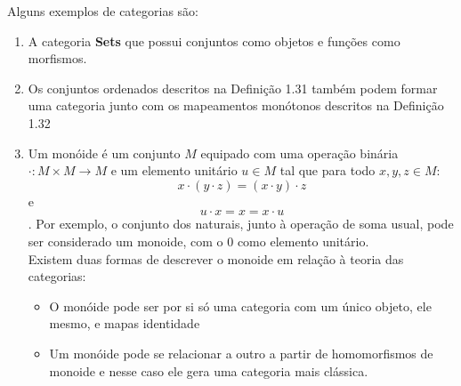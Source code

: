 \documentclass[../main.tex]{subfiles}
\begin{document}
Alguns exemplos de categorias são:

\begin{enumerate}
    \item A categoria \textbf{Sets} que possui conjuntos como objetos e funções como morfismos. 
    \item Os conjuntos ordenados descritos na Definição 1.31 também podem formar uma categoria junto com os mapeamentos monótonos descritos na Definição 1.32
    \item Um monóide é um conjunto $M$ equipado com uma operação binária $\cdot : M \times M \to M$ e um elemento unitário $u \in M$ tal que para todo $x, y, z \in M$: $$x \cdot (y \cdot z) = (x \cdot y) \cdot z$$ e $$u \cdot x = x = x \cdot u$$. Por exemplo, o conjunto dos naturais, junto à operação de soma usual, pode ser considerado um monoide, com o $0$ como elemento unitário. \\
    Existem duas formas de descrever o monoide em relação à teoria das categorias:
    \begin{itemize}
        \item O monóide pode ser por si só uma categoria com um único objeto, ele mesmo, e mapas identidade
        \item Um monóide pode se relacionar a outro a partir de homomorfismos de monoide e nesse caso ele gera uma categoria mais clássica.
    \end{itemize}
\end{enumerate}
\end{document}
